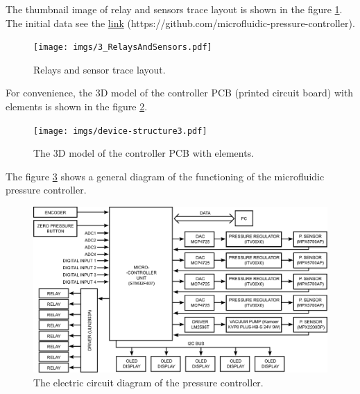 \documentclass[twoside, 12pt, a4paper]{refart}
\begin{document}
    The thumbnail image of relay and sensors trace layout is shown in the figure \ref{fig:3RelaysAndSensors}.\\
    The initial data see the \href{https://github.com/microfluidic-pressure-controller}{link} (https://github.com/microfluidic-pressure-controller).\\
    \begin{figure}[H]
	  \begin{center}
	  \texttt{[image: imgs/3\_RelaysAndSensors.pdf]}
	  \caption{Relays and sensor trace layout.}
	  \label{fig:3RelaysAndSensors}
	  \end{center}
    \end{figure}
    

          
    \newpage
    For convenience, the 3D model of the controller PCB (printed circuit board) with elements is shown in the figure \ref{fig:device-structure3}.
    \begin{figure}[H]
	  \begin{center}
	  \texttt{[image: imgs/device-structure3.pdf]}
	  \caption{The 3D model of the controller PCB with elements.}
	  \label{fig:device-structure3}
	  \end{center}
    \end{figure}
    
    
    The figure \ref{fig:mainscheme} shows a general diagram of the functioning of the microfluidic pressure controller.
    
    \begin{figure}[H]
	  \begin{center}
	  \includegraphics[width=\textwidth]{imgs/main-scheme.png}
	  \caption{The electric circuit diagram of the pressure controller.}
	  \label{fig:mainscheme}
	  \end{center}
    \end{figure}
    
\end{document}
